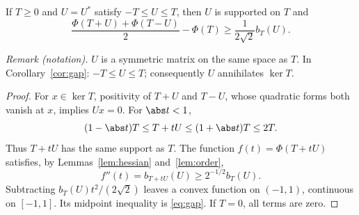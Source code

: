 \begin{corollary}\label{cor:gap}
If \(T\ge0\) and \(U=U^*\) satisfy \(-T\le U\le T\), then \(U\) is
supported on \(T\) and
\begin{equation}\label{eq:gap}
 \frac{\Phi(T+U)+\Phi(T-U)}2-\Phi(T)
       \ge\frac{1}{2\sqrt2}b_T(U).
\end{equation}
\end{corollary}

\noindent\textit{Remark (notation).} $U$ is a symmetric matrix on the same space as $T$. In Corollary~\ref{cor:gap}: $-T\le U\le T$; consequently $U$ annihilates $\ker T$.


\begin{proof}
For \(x\in\ker T\), positivity of \(T+U\) and \(T-U\), whose quadratic
forms both vanish at \(x\), implies \(Ux=0\).
For \(\abs t<1\),
\[
 (1-\abs t)T\le T+tU\le(1+\abs t)T\le2T.
\]
Thus \(T+tU\) has the same support as \(T\). The function
\(f(t)=\Phi(T+tU)\) satisfies, by Lemmas~\ref{lem:hessian}
and~\ref{lem:order},
\[
 f''(t)=b_{T+tU}(U)\ge 2^{-1/2}b_T(U).
\]
Subtracting \(b_T(U)t^2/(2\sqrt2)\) leaves a convex function on
\((-1,1)\), continuous on \([-1,1]\). Its midpoint inequality is
\eqref{eq:gap}. If \(T=0\), all terms are zero.
\end{proof}
